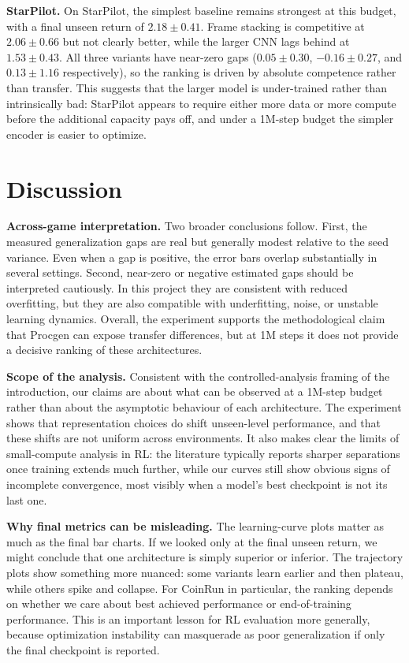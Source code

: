 \documentclass[10pt,twocolumn]{article}
\begin{document}
\textbf{StarPilot.} On StarPilot, the simplest baseline remains strongest at this budget, with a final unseen return of $2.18 \pm 0.41$. Frame stacking is competitive at $2.06 \pm 0.66$ but not clearly better, while the larger CNN lags behind at $1.53 \pm 0.43$. All three variants have near-zero gaps ($0.05 \pm 0.30$, $-0.16 \pm 0.27$, and $0.13 \pm 1.16$ respectively), so the ranking is driven by absolute competence rather than transfer. This suggests that the larger model is under-trained rather than intrinsically bad: StarPilot appears to require either more data or more compute before the additional capacity pays off, and under a 1M-step budget the simpler encoder is easier to optimize.

\section{Discussion}
\textbf{Across-game interpretation.} Two broader conclusions follow. First, the measured generalization gaps are real but generally modest relative to the seed variance. Even when a gap is positive, the error bars overlap substantially in several settings. Second, near-zero or negative estimated gaps should be interpreted cautiously. In this project they are consistent with reduced overfitting, but they are also compatible with underfitting, noise, or unstable learning dynamics. Overall, the experiment supports the methodological claim that Procgen can expose transfer differences, but at 1M steps it does not provide a decisive ranking of these architectures.

\textbf{Scope of the analysis.} Consistent with the controlled-analysis framing of the introduction, our claims are about what can be observed at a 1M-step budget rather than about the asymptotic behaviour of each architecture. The experiment shows that representation choices do shift unseen-level performance, and that these shifts are not uniform across environments. It also makes clear the limits of small-compute analysis in RL: the literature typically reports sharper separations once training extends much further, while our curves still show obvious signs of incomplete convergence, most visibly when a model's best checkpoint is not its last one.

\textbf{Why final metrics can be misleading.} The learning-curve plots matter as much as the final bar charts. If we looked only at the final unseen return, we might conclude that one architecture is simply superior or inferior. The trajectory plots show something more nuanced: some variants learn earlier and then plateau, while others spike and collapse. For CoinRun in particular, the ranking depends on whether we care about best achieved performance or end-of-training performance. This is an important lesson for RL evaluation more generally, because optimization instability can masquerade as poor generalization if only the final checkpoint is reported.
\end{document}
